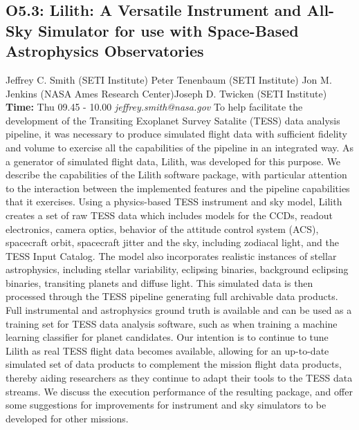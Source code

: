 \documentclass{report}
\begin{document}
\subsection*{O5.3: Lilith: A Versatile Instrument and All-Sky Simulator for use with Space-Based Astrophysics Observatories}
\bigskip
Jeffrey C. Smith (SETI Institute) \newline Peter Tenenbaum (SETI Institute) \newline  Jon M. Jenkins (NASA Ames Research Center)\newline  Joseph D. Twicken (SETI Institute)\newline  \newline  \newline\newline
{\bf Time:} Thu 09.45 - 10.00\newline
\newline
{\it jeffrey.smith@nasa.gov}\newline
\newline\newline
To help facilitate the development of the Transiting Exoplanet Survey Satalite (TESS) data analysis pipeline, it was necessary to produce simulated flight data with sufficient fidelity and volume to exercise all the capabilities of the pipeline in an integrated way. As a generator of simulated flight data, Lilith, was developed for this purpose. We describe the capabilities of the Lilith software package, with particular attention to the interaction between the implemented features and the pipeline capabilities that it exercises.  Using a physics-based TESS instrument and sky model, Lilith creates a set of raw TESS data which includes models for the CCDs, readout electronics, camera optics, behavior of the attitude control system (ACS), spacecraft orbit, spacecraft jitter and the sky, including zodiacal light, and the TESS Input Catalog. The model also incorporates realistic instances of stellar astrophysics, including stellar variability, eclipsing binaries, background eclipsing binaries, transiting planets and diffuse light. This simulated data is then processed through the TESS pipeline generating full archivable data products. Full instrumental and astrophysics ground truth is available and can be used as a training set for TESS data analysis software, such as when training a machine learning classifier for planet candidates. Our intention is to continue to tune Lilith as real TESS flight data becomes available, allowing for an up-to-date simulated set of data products to complement the mission flight data products, thereby aiding researchers as they continue to adapt their tools to the TESS data streams. We discuss the execution performance of the resulting package, and offer some suggestions for improvements for instrument and sky simulators to be developed for other missions.\newline
\newpage
\end{document}
